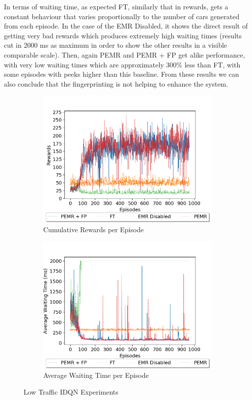 \documentclass{llncs}
\begin{document}
In terms of waiting time, as expected FT, similarly that in rewards, gets a constant behaviour that varies proportionally to the number of cars generated from each episode. In the case of the EMR Disabled, it shows the direct result of getting very bad rewards which produces extremely high waiting times (results cut in 2000 ms as maximum in order to show the other results in a visible comparable scale). Then, again PEMR and PEMR + FP get alike performance, with very low waiting times which are approximately 300$\%$ less than FT, with some episodes with peeks higher than this baseline. From these results we can also conclude that the fingerprinting is not helping to enhance the system.

\begin{figure}
    \centering
    \begin{subfigure}[b]{0.48\textwidth}
        \includegraphics[width=\textwidth]{images/Low-Load-REW.png}
  		\caption{Cumulative Rewards per Episode}
  		\label{fig:LowIDQNREW}
    \end{subfigure}
    \begin{subfigure}[b]{0.48\textwidth}
        \includegraphics[width=\textwidth]{images/Low-Load-AWT.png}
  		\caption{Average Waiting Time per Episode}
  		\label{fig:LowIDQNAWT}
    \end{subfigure}
    \caption{Low Traffic IDQN Experiments}\label{fig:LowIDQNExp}
\end{figure}
\end{document}
